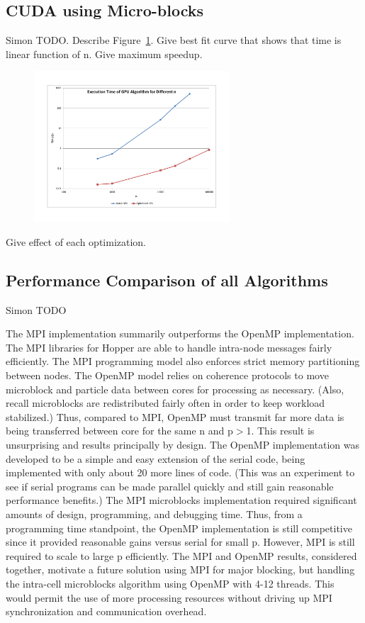 \documentclass[11pt]{article} %
\begin{document}
\subsection{CUDA using Micro-blocks}

Simon TODO. Describe Figure~\ref{gpu_time_vs_n}. Give best fit curve that shows that time is linear function of n. Give maximum speedup.

\begin{figure}[!h]
\centering
\includegraphics*[width=0.65\textwidth, viewport= 70 70 730 550]{figures/gpu_time_vs_n}
\caption{}
\label{gpu_time_vs_n}
\end{figure}

Give effect of each optimization.

\subsection{Performance Comparison of all Algorithms}

Simon TODO

The MPI implementation summarily outperforms the OpenMP implementation. The MPI libraries for Hopper are able to handle intra-node messages fairly efficiently. The MPI programming model also enforces strict memory partitioning between nodes. The OpenMP model relies on coherence protocols to move microblock and particle data between cores for processing as necessary. (Also, recall microblocks are redistributed fairly often in order to keep workload stabilized.) Thus, compared to MPI, OpenMP must transmit far more data is being transferred between core for the same n and p$>$1. This result is unsurprising and results principally by design. The OpenMP implementation was developed to be a simple and easy extension of the serial code, being implemented with only about 20 more lines of code. (This was an experiment to see if serial programs can be made parallel quickly and still gain reasonable performance benefits.) The MPI microblocks implementation required significant amounts of design, programming, and debugging time. Thus, from a programming time standpoint, the OpenMP implementation is still competitive since it provided reasonable gains versus serial for small p. However, MPI is still required to scale to large p efficiently. The MPI and OpenMP results, considered together, motivate a future solution using MPI for major blocking, but handling the intra-cell microblocks algorithm using OpenMP with 4-12 threads. This would permit the use of more processing resources without driving up MPI synchronization and communication overhead.
\end{document}
